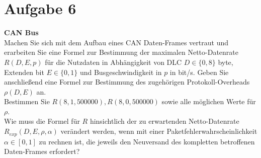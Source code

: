 \documentclass[12pt,a4paper,ngerman]{article}
\begin{document}
\section*{Aufgabe 6}


\begin{framed}
\textbf{CAN Bus}\\
Machen Sie sich mit dem Aufbau eines CAN Daten-Frames vertraut und erarbeiten Sie eine Formel zur Bestimmung der maximalen Netto-Datenrate $R(D,E,p)$ für die Nutzdaten in Abhängigkeit von DLC $D \in \{0,8\}$ byte, Extenden bit $E \in \{0,1\}$ und Busgeschwindigkeit in $p$ in bit/s. Geben Sie anschließend eine Formel zur Bestimmung des zugehörigen Protokoll-Overheads $\rho (D,E)$ an. \\
Bestimmen Sie $R(8,1,500000),R(8,0,500000)$ sowie alle möglichen Werte für $\rho$. \\
Wie muss die Formel für $R$ hinsichtlich der zu erwartenden Netto-Datenrate $R_{exp}(D,E,\rho, \alpha)$ verändert werden, wenn mit einer Paketfehlerwahrscheinlichkeit $\alpha \in [0,1]$ zu rechnen ist, die jeweils den Neuversand des kompletten betroffenen Daten-Frames erfordert? 
\end{framed}



   
   
\end{document}
